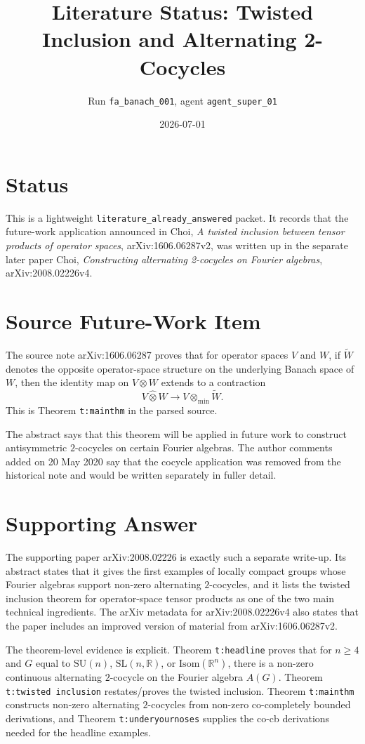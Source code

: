\documentclass[11pt]{article}
\title{Literature Status: Twisted Inclusion and Alternating 2-Cocycles}
\author{Run \texttt{fa\_banach\_001}, agent \texttt{agent\_super\_01}}
\date{2026-07-01}
\begin{document}
\maketitle

\section*{Status}

This is a lightweight \texttt{literature\_already\_answered} packet. It records
that the future-work application announced in Choi,
\emph{A twisted inclusion between tensor products of operator spaces},
arXiv:1606.06287v2, was written up in the separate later paper Choi,
\emph{Constructing alternating 2-cocycles on Fourier algebras},
arXiv:2008.02226v4.

\section*{Source Future-Work Item}

The source note arXiv:1606.06287 proves that for operator spaces $V$ and $W$,
if $\widetilde W$ denotes the opposite operator-space structure on the
underlying Banach space of $W$, then the identity map on $V\otimes W$ extends
to a contraction
\[
  V\widehat{\otimes} W \longrightarrow V\otimes_{\min}\widetilde W .
\]
This is Theorem \texttt{t:mainthm} in the parsed source.

The abstract says that this theorem will be applied in future work to construct
antisymmetric $2$-cocycles on certain Fourier algebras. The author comments
added on 20 May 2020 say that the cocycle application was removed from the
historical note and would be written separately in fuller detail.

\section*{Supporting Answer}

The supporting paper arXiv:2008.02226 is exactly such a separate write-up. Its
abstract states that it gives the first examples of locally compact groups
whose Fourier algebras support non-zero alternating $2$-cocycles, and it lists
the twisted inclusion theorem for operator-space tensor products as one of the
two main technical ingredients. The arXiv metadata for arXiv:2008.02226v4 also
states that the paper includes an improved version of material from
arXiv:1606.06287v2.

The theorem-level evidence is explicit. Theorem \texttt{t:headline} proves
that for $n\geq 4$ and $G$ equal to $\mathrm{SU}(n)$, $\mathrm{SL}(n,\mathbb
R)$, or $\mathrm{Isom}(\mathbb R^n)$, there is a non-zero continuous
alternating $2$-cocycle on the Fourier algebra $A(G)$. Theorem
\texttt{t:twisted inclusion} restates/proves the twisted inclusion. Theorem
\texttt{t:mainthm} constructs non-zero alternating $2$-cocycles from non-zero
co-completely bounded derivations, and Theorem \texttt{t:underyournoses}
supplies the co-cb derivations needed for the headline examples.
\end{document}
